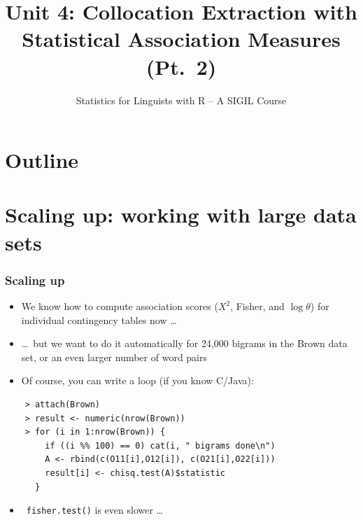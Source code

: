 \documentclass[handout,notes=show,t]{beamer} %
\title[4b.\ Collocations (part 2)]{Unit 4: Collocation Extraction with
  Statistical Association Measures (Pt.~2)}
\subtitle{Statistics for Linguists with R -- A SIGIL Course}
\date[sigil.r-forge.r-project.org]{%
  \light{\tiny \sigilcopyright}}
\begin{document}
\frame{\titlepage}


\section*{Outline}

\section{Scaling up: working with large data sets}

\begin{frame}[fragile]
  \frametitle{Scaling up}

  \begin{itemize}
  \item We know how to compute association scores ($X^2$, Fisher, and $\log
    \theta$) for individual contingency tables now \ldots\pause
  \item[] \ldots\ but we want to do it automatically for 24,000 bigrams in the
    Brown data set, or an even larger number of word pairs%
    \pause
  \item Of course, you can write a loop (if you know C/Java):
  \end{itemize}
  
\begin{verbatim}
    > attach(Brown)
    > result <- numeric(nrow(Brown))
    > for (i in 1:nrow(Brown)) {
        if ((i %% 100) == 0) cat(i, " bigrams done\n")
        A <- rbind(c(O11[i],O12[i]), c(O21[i],O22[i]))
        result[i] <- chisq.test(A)$statistic
      }
\end{verbatim}

  \begin{itemize}
  \item[] \hand\ \verb|fisher.test()| is even slower \ldots
  \end{itemize}
\end{frame}
\end{document}
